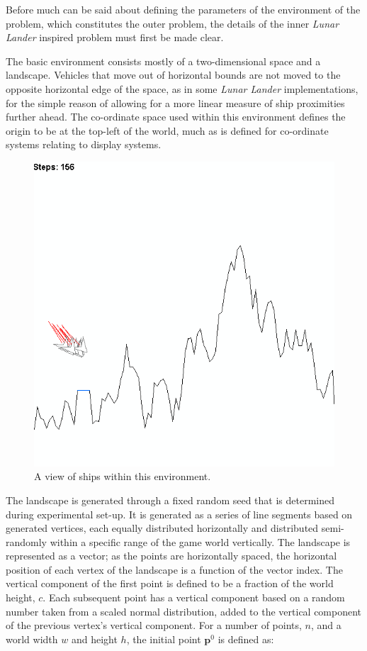\documentclass[conference]{IEEEtran}
\begin{document}
Before much can be said about defining the parameters of the environment of the problem, which constitutes the outer problem, the details of the inner {\itshape Lunar Lander} inspired problem must first be made clear.

The basic environment consists mostly of a two-dimensional space and a landscape. Vehicles that move out of horizontal bounds are not moved to the opposite horizontal edge of the space, as in some {\itshape Lunar Lander} implementations, for the simple reason of allowing for a more linear measure of ship proximities further ahead. The co-ordinate space used within this environment defines the origin to be at the top-left of the world, much as is defined for co-ordinate systems relating to display systems. 

\begin{figure}[hbtp]
\centering
\includegraphics[scale=0.53]{img/lunarlandscape}
\caption{A view of ships within this environment.}
\label{fig:lunarlandscape}
\end{figure}

The landscape is generated through a fixed random seed that is determined during experimental set-up. It is generated as a series of line segments based on generated vertices, each equally distributed horizontally and distributed semi-randomly within a specific range of the game world vertically. The landscape is represented as a vector; as the points are horizontally spaced, the horizontal position of each vertex of the landscape is a function of the vector index. The vertical component of the first point is defined to be a fraction of the world height, $c$. Each subsequent point has a vertical component based on a random number taken from a scaled normal distribution, added to the vertical component of the previous vertex's vertical component. For a number of points, $n$, and a world width $w$ and height $h$, the initial point $\boldsymbol {p}^{0}$ is defined as:
\end{document}
